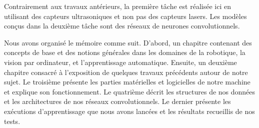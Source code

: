 Contrairement aux travaux
antérieurs, la première tâche est réalisée ici en utilisant des capteurs ultrasoniques
et non pas des capteurs lasers. Les modèles conçus dans la deuxième tâche sont
des réseaux de neurones convolutionnels.

Nous avons organisé le mémoire comme suit.
D'abord, un chapitre contenant des concepts de base et des notions générales dans
les domaines de la robotique, la vision par ordinateur, et l'apprentissage automatique.
Ensuite, un deuxième chapitre consacré à l'exposition de quelques travaux précédents
autour de notre sujet. Le troisième présente les parties
matérielles et logicielles de notre machine et explique son fonctionnement.
Le quatrième décrit les structures de nos données et les
architectures de nos réseaux convolutionnels. Le dernier présente
les exécutions d'apprentissage que nous avons lancées et les résultats recueillis
de nos tests.

